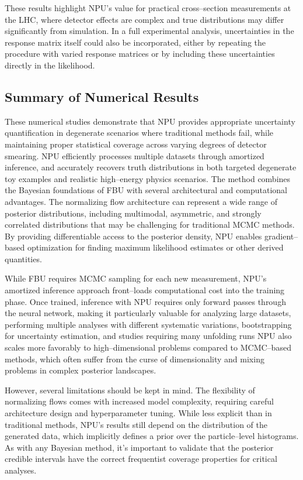         These results highlight NPU's value for practical cross--section measurements at the LHC, where detector effects are complex and true distributions may differ significantly from simulation.
        In a full experimental analysis, uncertainties in the response matrix itself could also be incorporated, either by repeating the procedure with varied response matrices or by including these uncertainties directly in the likelihood.
        
\subsection{Summary of Numerical Results}
    These numerical studies demonstrate that NPU provides appropriate uncertainty quantification in degenerate scenarios where traditional methods fail, while maintaining proper statistical coverage across varying degrees of detector smearing.
    NPU efficiently processes multiple datasets through amortized inference, and accurately recovers truth distributions in both targeted degenerate toy examples and realistic high--energy physics scenarios.
    The method combines the Bayesian foundations of FBU with several architectural and computational advantages.
    The normalizing flow architecture can represent a wide range of posterior distributions, including multimodal, asymmetric, and strongly correlated distributions that may be challenging for traditional MCMC methods.
    By providing differentiable access to the posterior density, NPU enables gradient--based optimization for finding maximum likelihood estimates or other derived quantities.

    While FBU requires MCMC sampling for each new measurement, NPU's amortized inference approach front--loads computational cost into the training phase.
    Once trained, inference with NPU requires only forward passes through the neural network, making it particularly valuable for analyzing large datasets, performing multiple analyses with different systematic variations, bootstrapping for uncertainty estimation, and studies requiring many unfolding runs
    NPU also scales more favorably to high--dimensional problems compared to MCMC--based methods, which often suffer from the curse of dimensionality and mixing problems in complex posterior landscapes.
    
    However, several limitations should be kept in mind.
    The flexibility of normalizing flows comes with increased model complexity, requiring careful architecture design and hyperparameter tuning.
    While less explicit than in traditional methods, NPU's results still depend on the distribution of the generated data, which implicitly defines a prior over the particle--level histograms.
    As with any Bayesian method, it's important to validate that the posterior credible intervals have the correct frequentist coverage properties for critical analyses.
    
